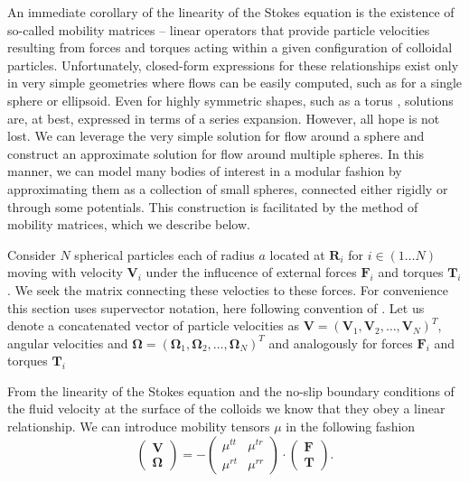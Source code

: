 \documentclass{doctoral}
\newcommand{\mm}[1]{\bm{\mathsf{#1}}} %
\begin{document}
An immediate corollary of the linearity of the Stokes equation is the existence of so-called mobility matrices -- linear operators that provide particle velocities resulting from forces and torques acting within a given configuration of colloidal particles.
Unfortunately, closed-form expressions for these relationships exist only in very simple geometries where flows can be easily computed, such as for a single sphere or ellipsoid.
Even for highly symmetric shapes, such as a torus \cite{Goren_1980, Majumdar_1977}, solutions are, at best, expressed in terms of a series expansion.
However, all hope is not lost.
We can leverage the very simple solution for flow around a sphere and construct an approximate solution for flow around multiple spheres.
In this manner, we can model many bodies of interest in a modular fashion by approximating them as a collection of small spheres, connected either rigidly or through some potentials.
This construction is facilitated by the method of mobility matrices, which we describe below.

Consider $N$ spherical particles each of radius $a$ located at $\bm{R}_i$ for $i \in (1 \dots N)$ moving with velocity $\bm{V}_i$ under the influcence of external forces $\bm{F}_i$ and torques $\bm{T}_i$.
We seek the matrix connecting these velocties to these forces.
For convenience this section uses supervector notation, here following convention of \cite{Nagele_2013}.
Let us denote a concatenated vector of particle velocities as $\bm{V} = (\bm{V}_1,\bm{V}_2,\dots,\bm{V}_N)^{T}$, angular velocities and $\bm{\Omega} = (\bm{\Omega}_1,\bm{\Omega}_2,\dots,\bm{\Omega}_N)^{T}$ and analogously for forces $\bm{F}_i$ and torques $\bm{T}_i$ 

From the linearity of the Stokes equation and the no-slip boundary conditions of the fluid velocity at the surface of the colloids we know that they obey a linear relationship.
We can introduce mobility tensors $\mm{\mu}$ in the following fashion
\begin{equation}
    \begin{pmatrix}
        \bm{V} \\
        \bm{\Omega}
    \end{pmatrix}
    = -
    \begin{pmatrix}
        \mm{\mu}^{tt} & \mm{\mu}^{tr} \\
        \mm{\mu}^{rt} & \mm{\mu}^{rr}
    \end{pmatrix}
    \cdot
    \begin{pmatrix}
        \bm{F} \\
        \bm{T}
    \end{pmatrix}
    .
    \label{eqn:mobility-matrix-definition}
\end{equation}
\end{document}
